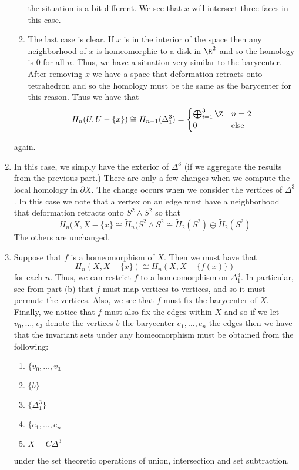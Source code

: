 \documentclass{article}
\begin{document}
\begin{solution}{\parindent}
\begin{enumerate}
\begin{enumerate}
      the situation is a bit different. We see that $x$ will intersect
      three faces in this case. 
    \item The last case is clear. If $x$ is in the interior of the
      space then any neighborhood of $x$ is homeomorphic to a disk in
      $\R^2$ and so the homology is 0 for all $n$. Thus, we have a
      situation very similar to the barycenter. After removing $x$ we
      have a space that deformation retracts onto tetrahedron and so
      the homology must be the same as the barycenter for this
      reason. Thus we have that
      \[
      H_n(U, U-\{x\}) \cong \tilde{H}_{n-1}(\Delta^3_1) =
      \begin{cases}
        \bigoplus_{i=1}^3 \Z & n = 2 \\
        0 & \text{else}
      \end{cases}
      \]
    \end{enumerate}
    again.
  \item In this case, we simply have the exterior of $\Delta^3$ (if we
    aggregate the results from the previous part.) There are only a
    few changes when we compute the local homology in $\partial
    X$. The change occurs when we consider the vertices of
    $\Delta^3$. In this case we note that a vertex on an edge must
    have a neighborhood that deformation retracts onto $S^2 \wedge
    S^2$ so that
    \[
    H_n(X,X - \{x\} \cong \tilde{H}_n(S^2\wedge S^2 \cong
    \tilde{H}_2(S^2)\oplus \tilde{H}_2(S^2)
    \]
    The others are unchanged.
  \item Suppose that $f$ is a homeomorphism of $X$. Then we must have
    that
    \[
    H_n(X, X - \{x\}) \cong H_n(X, X - \{f(x)\})
    \]
    for each $n$. Thus, we can restrict $f$ to a homeomorphism on
    $\Delta_1^3$. In particular, see from part (b) that $f$ must map
    vertices to vertices, and so it must permute the vertices. Also,
    we see that $f$ must fix the barycenter of $X$. Finally, we notice
    that $f$ must also fix the edges within $X$ and so if we let
    $v_0,\ldots,v_3$ denote the vertices $b$ the barycenter
    $e_1,\ldots,e_n$ the edges then we have that the invariant sets
    under any homeomorphism must be obtained from the following:
    \begin{enumerate}
    \item $\{v_0,\ldots,v_3$
    \item $\{b\}$
    \item $\{\Delta_1^3\}$
    \item $\{e_1,\ldots,e_n$
    \item $X = C\Delta^3$
    \end{enumerate}
    under the set theoretic operations of union, intersection and set
    subtraction.
  \end{enumerate}
\end{solution}
\end{document}

